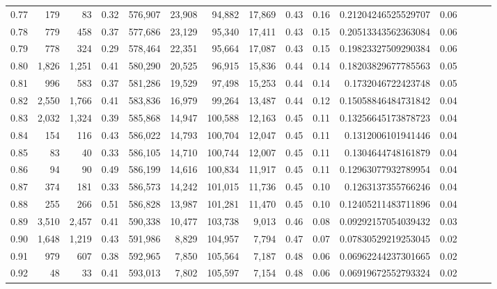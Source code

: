 \begin{tabular}{rrrrrrrrrrrrrrr}
0.77 &     179 &     83 &  0.32 &  576,907 &   23,908 &   94,882 &   17,869 &  0.43 &  0.16 &   0.21204246525529707 &      0.06 \\
0.78 &     779 &    458 &  0.37 &  577,686 &   23,129 &   95,340 &   17,411 &  0.43 &  0.15 &   0.20513343562363084 &      0.06 \\
0.79 &     778 &    324 &  0.29 &  578,464 &   22,351 &   95,664 &   17,087 &  0.43 &  0.15 &   0.19823327509290384 &      0.06 \\
0.80 &   1,826 &  1,251 &  0.41 &  580,290 &   20,525 &   96,915 &   15,836 &  0.44 &  0.14 &   0.18203829677785563 &      0.05 \\
0.81 &     996 &    583 &  0.37 &  581,286 &   19,529 &   97,498 &   15,253 &  0.44 &  0.14 &    0.1732046722423748 &      0.05 \\
0.82 &   2,550 &  1,766 &  0.41 &  583,836 &   16,979 &   99,264 &   13,487 &  0.44 &  0.12 &   0.15058846484731842 &      0.04 \\
0.83 &   2,032 &  1,324 &  0.39 &  585,868 &   14,947 &  100,588 &   12,163 &  0.45 &  0.11 &   0.13256645173878723 &      0.04 \\
0.84 &     154 &    116 &  0.43 &  586,022 &   14,793 &  100,704 &   12,047 &  0.45 &  0.11 &    0.1312006101941446 &      0.04 \\
0.85 &      83 &     40 &  0.33 &  586,105 &   14,710 &  100,744 &   12,007 &  0.45 &  0.11 &    0.1304644748161879 &      0.04 \\
0.86 &      94 &     90 &  0.49 &  586,199 &   14,616 &  100,834 &   11,917 &  0.45 &  0.11 &   0.12963077932789954 &      0.04 \\
0.87 &     374 &    181 &  0.33 &  586,573 &   14,242 &  101,015 &   11,736 &  0.45 &  0.10 &    0.1263137355766246 &      0.04 \\
0.88 &     255 &    266 &  0.51 &  586,828 &   13,987 &  101,281 &   11,470 &  0.45 &  0.10 &   0.12405211483711896 &      0.04 \\
0.89 &   3,510 &  2,457 &  0.41 &  590,338 &   10,477 &  103,738 &    9,013 &  0.46 &  0.08 &   0.09292157054039432 &      0.03 \\
0.90 &   1,648 &  1,219 &  0.43 &  591,986 &    8,829 &  104,957 &    7,794 &  0.47 &  0.07 &   0.07830529219253045 &      0.02 \\
0.91 &     979 &    607 &  0.38 &  592,965 &    7,850 &  105,564 &    7,187 &  0.48 &  0.06 &   0.06962244237301665 &      0.02 \\
0.92 &      48 &     33 &  0.41 &  593,013 &    7,802 &  105,597 &    7,154 &  0.48 &  0.06 &   0.06919672552793324 &      0.02 \\

\end{tabular}
